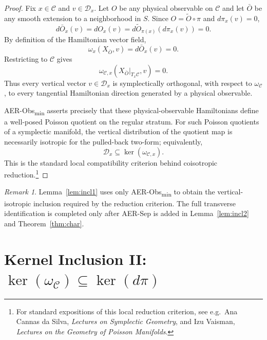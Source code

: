 \documentclass[11pt]{article}
\theoremstyle{remark}
\newtheorem{remark}[definition]{Remark}
\theoremstyle{plain}
\begin{document}
\begin{proof}
Fix $x\in\mathcal{C}$ and $v\in\mathcal{D}_x$.
Let $O$ be any physical observable on $\mathcal{C}$ and let $\bar O$ be any smooth extension to a neighborhood in $S$.
Since $O=\tilde O\circ\pi$ and $d\pi_x(v)=0$,
\begin{equation}
d\bar O_x(v)=dO_x(v)=d\tilde O_{\pi(x)}(d\pi_x(v))=0.
\label{eq:dOvanish}
\end{equation}
By definition of the Hamiltonian vector field,
\begin{equation}
\omega_x(X_{\bar O},v)=d\bar O_x(v)=0.
\end{equation}
Restricting to $\mathcal{C}$ gives
\begin{equation}
\omega_{\mathcal{C},x}(X_{\bar O}|_{T_x\mathcal{C}},v)=0.
\label{eq:orth-to-XO}
\end{equation}
Thus every vertical vector $v\in\mathcal{D}_x$ is symplectically orthogonal, with respect to $\omega_{\mathcal{C}}$,
to every tangential Hamiltonian direction generated by a physical observable.

AER-Obs\textsubscript{min} asserts precisely that these physical-observable Hamiltonians define a well-posed Poisson quotient on the regular stratum.
For such Poisson quotients of a symplectic manifold, the vertical distribution of the quotient map is necessarily isotropic for the pulled-back two-form; equivalently,
\begin{equation}
\mathcal{D}_x\subseteq\ker(\omega_{\mathcal{C},x}).
\end{equation}
This is the standard local compatibility criterion behind coisotropic reduction.\footnote{For standard expositions of this local reduction criterion, see e.g.\ Ana Cannas da Silva, \emph{Lectures on Symplectic Geometry}, and Izu Vaisman, \emph{Lectures on the Geometry of Poisson Manifolds}.}
\end{proof}

\begin{remark}
Lemma~\ref{lem:incl1} uses only AER-Obs\textsubscript{min} to obtain the vertical-isotropic inclusion required by the reduction criterion.
The full transverse identification is completed only after AER-Sep is added in Lemma~\ref{lem:incl2} and Theorem~\ref{thm:char}.
\end{remark}

\section{Kernel Inclusion II: \texorpdfstring{$\ker(\omega_{\mathcal{C}})\subseteq\ker(d\pi)$}{ker(omegaC) subset ker(dpi)}}
\end{document}
